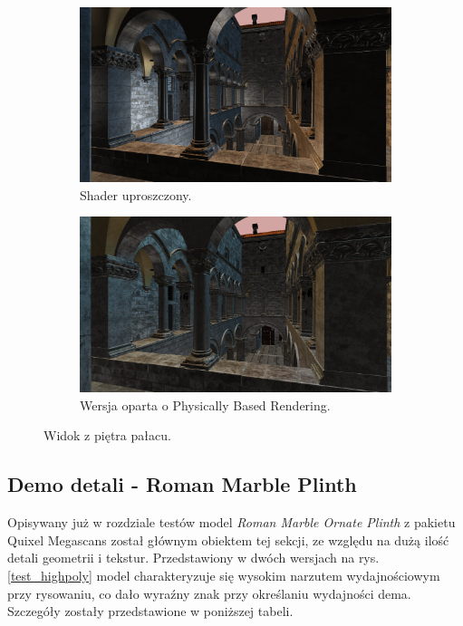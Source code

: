 \begin{figure}[h!]
	\centering
	\begin{subfigure}{.45\textwidth}
		\includegraphics[width=\textwidth]{images/demo_sponza_4.png}
		\caption{Shader uproszczony.}
	\end{subfigure}
	\begin{subfigure}{.45\textwidth}
		\includegraphics[width=\textwidth]{images/demo_sponza_4_pbr.png}
		\caption{Wersja oparta o Physically Based Rendering.}
	\end{subfigure}
	\caption{Widok z piętra pałacu.}
	\label{test_sponza_3}
\end{figure}

\subsection{Demo detali - Roman Marble Plinth}
Opisywany już w rozdziale testów model \textit{Roman Marble Ornate Plinth} z pakietu Quixel Megascans został głównym obiektem tej sekcji, ze względu na dużą ilość detali geometrii i tekstur. Przedstawiony w dwóch wersjach na rys. \ref{test_highpoly} model charakteryzuje się wysokim narzutem wydajnościowym przy rysowaniu, co dało wyraźny znak przy określaniu wydajności dema. Szczegóły zostały przedstawione w poniższej tabeli.

